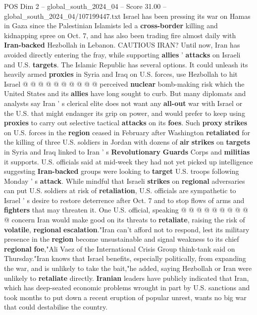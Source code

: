 \begin{textsample}{POS Dim 2 – global\_south\_2024\_04 – Score 31.00 – global\_south\_2024\_04/107199447.txt}
Israel has been pressing its war on Hamas in Gaza since the Palestinian Islamists led a \textbf{cross-border} killing and kidnapping spree on Oct. 7, and has also been trading fire almost daily with \textbf{Iran-backed} Hezbollah in Lebanon.
CAUTIOUS IRAN?
Until now, Iran has avoided directly entering the fray, while supporting \textbf{allies} ' \textbf{attacks} on Israeli and U.S. \textbf{targets}.
The Islamic Republic has several options.
It could unleash its heavily armed \textbf{proxies} in Syria and Iraq on U.S. forces, use Hezbollah to hit Israel @ @ @ @ @ @ @ @ @ @ perceived \textbf{nuclear} bomb-making risk which the United States and its \textbf{allies} have long sought to curb.
But many diplomats and analysts say Iran ' s clerical elite does not want any \textbf{all-out} war with Israel or the U.S. that might endanger its grip on power, and would prefer to keep using \textbf{proxies} to carry out selective tactical \textbf{attacks} on its \textbf{foes}.
Such \textbf{proxy} \textbf{strikes} on U.S. forces in the \textbf{region} ceased in February after Washington \textbf{retaliated} for the killing of three U.S. soldiers in Jordan with dozens of \textbf{air} \textbf{strikes} on \textbf{targets} in Syria and Iraq linked to Iran ' s \textbf{Revolutionary} \textbf{Guards} Corps and \textbf{militias} it supports.
U.S. officials said at mid-week they had not yet picked up intelligence suggesting \textbf{Iran-backed} groups were looking to \textbf{target} U.S. troops following Monday ' s \textbf{attack}.
While mindful that Israeli \textbf{strikes} on \textbf{regional} adversaries can put U.S. soldiers at risk of \textbf{retaliation}, U.S. officials are sympathetic to Israel ' s desire to restore deterrence after Oct. 7 and to stop flows of arms and \textbf{fighters} that may threaten it.
One U.S. official, speaking @ @ @ @ @ @ @ @ @ @ concern Iran would make good on its threats to \textbf{retaliate}, raising the risk of \textbf{volatile}, \textbf{regional} \textbf{escalation}."Iran can't afford not to respond, lest its military presence in the \textbf{region} become unsustainable and signal weakness to its chief \textbf{regional} \textbf{foe},"Ali Vaez of the International Crisis Group think-tank said on Thursday."Iran knows that Israel benefits, especially politically, from expanding the war, and is unlikely to take the bait,"he added, saying Hezbollah or Iran were unlikely to \textbf{retaliate} directly. \textbf{Iranian} leaders have publicly indicated that Iran, which has deep-seated economic problems wrought in part by U.S. sanctions and took months to put down a recent eruption of popular unrest, wants no big war that could destabilise the country.

\end{textsample}
